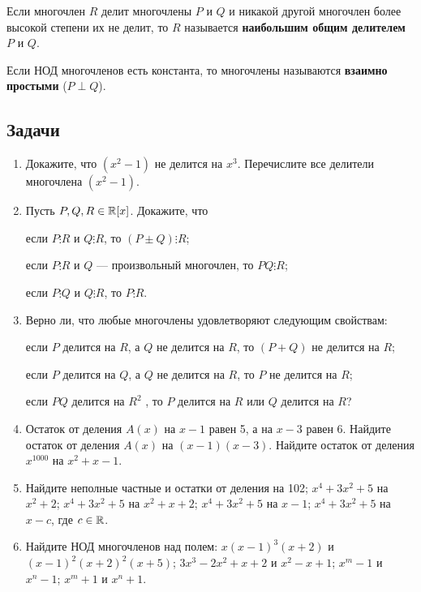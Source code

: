 Если многочлен $R$ делит многочлены $P$ и $Q$ и никакой другой многочлен более высокой степени их не делит, то $R$ называется \textbf{наибольшим общим делителем} $P$ и $Q$.

Если НОД многочленов есть константа, то многочлены называются \textbf{взаимно простыми} ($P\perp Q$).


\subsection*{Задачи}

\begin{enumerate}

\item Докажите, что $(x^2 - 1)$ не делится на $x^3$. Перечислите все делители многочлена $(x^2 - 1)$.
\item Пусть $P, Q, R \in \mathbb R[x]$. Докажите, что

\noindent\ipunkt если $P \vdots R$ и $Q \vdots R$, то $(P \pm Q) \vdots R$;

\noindent\ipunkt если $P \vdots R$ и $Q$ --- произвольный многочлен, то $PQ \vdots R$;

\noindent\ipunkt если $P \vdots Q$ и $Q \vdots R$, то $P \vdots R$.

\item Верно ли, что любые многочлены удовлетворяют следующим свойствам:

\noindent\ipunkt  если $P$ делится на $R$, а $Q$ не делится на $R$, то $(P + Q)$ не делится на $R$;

\noindent\ipunkt  если $P$ делится на $Q$, а $Q$ не делится на $R$, то $P$ не делится на $R$;

\noindent\ipunkt  если $PQ$ делится на $R^2$ , то $P$ делится на $R$ или $Q$ делится на $R$?

\item \ipunkt Остаток от деления $A(x)$ на $x - 1$ равен 5, а на $x - 3$ равен
6. Найдите остаток от деления $A(x)$ на $(x - 1)(x - 3)$.
\ipunkt Найдите остаток от деления $x^{1000}$ на $x^2 + x - 1$.

\item Найдите неполные частные и остатки от деления
 на 102; \ipunkt $x^4 + 3x^2 + 5$ на $x^2 + 2$;
\ipunkt $x^4 + 3x^2 + 5$ на $x^2 + x + 2$;
\ipunkt $x^4 + 3x^2 + 5$ на $x - 1$;
\ipunkt $x^4 + 3x^2 + 5$ на $x - c$, где $c \in \mathbb R$.

\item Найдите НОД многочленов над полем: \ipunkt $x(x - 1)^3(x + 2)$ и $(x - 1)^2 (x +2)^2(x + 5)$;
\ipunkt $3x^3 -2x^2 + x + 2$ и $x^2 - x + 1$; \ipunkt $x^m - 1$ и $x^n - 1$;
\ipunkt $x^m + 1$ и $x^n + 1$.


\end{enumerate}
